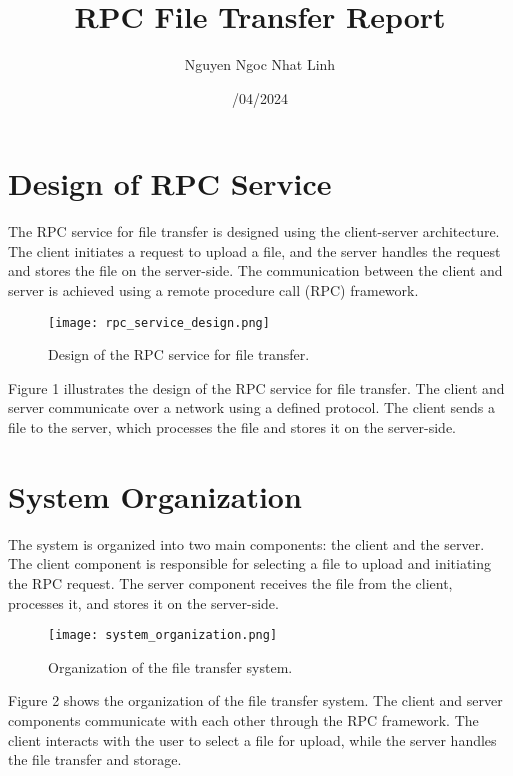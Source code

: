 \documentclass{article}
\begin{document}
\title{RPC File Transfer Report}
\author{Nguyen Ngoc Nhat Linh}
\date{/04/2024}
\maketitle

\section{Design of RPC Service}

The RPC service for file transfer is designed using the client-server architecture. The client initiates a request to upload a file, and the server handles the request and stores the file on the server-side. The communication between the client and server is achieved using a remote procedure call (RPC) framework.

\begin{figure}[h]
  \centering
  \texttt{[image: rpc\_service\_design.png]}
  \caption{Design of the RPC service for file transfer.}
\end{figure}

Figure 1 illustrates the design of the RPC service for file transfer. The client and server communicate over a network using a defined protocol. The client sends a file to the server, which processes the file and stores it on the server-side.

\section{System Organization}

The system is organized into two main components: the client and the server. The client component is responsible for selecting a file to upload and initiating the RPC request. The server component receives the file from the client, processes it, and stores it on the server-side.

\begin{figure}[h]
  \centering
  \texttt{[image: system\_organization.png]}
  \caption{Organization of the file transfer system.}
\end{figure}

Figure 2 shows the organization of the file transfer system. The client and server components communicate with each other through the RPC framework. The client interacts with the user to select a file for upload, while the server handles the file transfer and storage.
\end{document}

